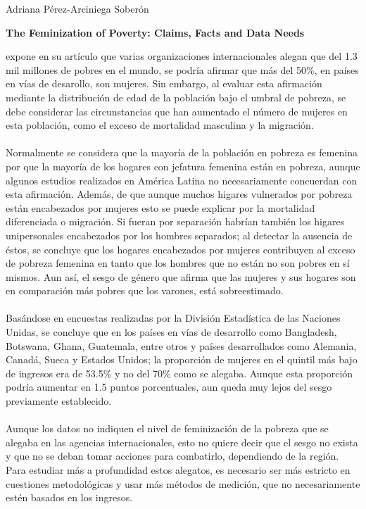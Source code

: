 \documentclass[11pt,spanish,letterpaper]{article}
\theoremstyle{plain}
\begin{document}
\begin{flushleft}
Adriana P\'erez-Arciniega Sober\'on
\end{flushleft}
\begin{center}
\textbf{The Feminization of Poverty: Claims, Facts and Data Needs}
\end{center}
\cite{marcoux1998feminization} expone en su art\'iculo que varias organizaciones internacionales alegan que del 1.3 mil millones de pobres en el mundo, se podr\'ia afirmar que m\'as del 50\%, en pa\'ises en v\'ias de desarollo, son mujeres. Sin embargo, al evaluar esta afirmaci\'on mediante la distribuci\'on de edad de la poblaci\'on bajo el umbral de pobreza, se debe considerar las circunstancias que han aumentado el n\'umero de mujeres en esta poblaci\'on, como el exceso de mortalidad masculina y la migraci\'on.\\
\\
Normalmente se considera que la mayor\'ia de la poblaci\'on en pobreza es femenina por que la mayor\'ia de los hogares con jefatura femenina est\'an en pobreza, aunque algunos estudios realizados en Am\'erica Latina no necesariamente concuerdan con esta afirmaci\'on. Adem\'as, de que aunque muchos higares vulnerados por pobreza est\'an encabezados por mujeres esto se puede explicar por la mortalidad diferenciada o migraci\'on. Si fueran por separaci\'on habr\'ian tambi\'en los higares unipersonales encabezados por los hombres separados; al detectar la ausencia de \'estos, se concluye que los hogares encabezados por mujeres contribuyen al exceso de pobreza femenina en tanto que los hombres que no est\'an no son pobres en s\'i mismos. Aun as\'i, el sesgo de g\'enero que afirma que las mujeres y sus hogares  son en comparaci\'on m\'as pobres que los varones, est\'a sobreestimado.\\
\\
Bas\'andose en encuestas realizadas por la Divisi\'on Estad\'istica de las Naciones Unidas, se concluye que en los pa\'ises en v\'ias de desarrollo como Bangladesh, Botswana, Ghana, Guatemala, entre otros y pa\'ises desarrollados como Alemania, Canad\'a, Sueca y Estados Unidos; la proporci\'on de mujeres en el quintil m\'as bajo de ingresos era de 53.5\% y no del 70\% como se alegaba. Aunque esta proporci\'on podr\'ia aumentar en 1.5 puntos porcentuales, aun queda muy lejos del sesgo previamente establecido.\\
\\
Aunque los datos no indiquen el nivel de feminizaci\'on de la pobreza que se alegaba en las agencias internacionales, esto no quiere decir que el sesgo no exista y que no se deban tomar acciones para combatirlo, dependiendo de la regi\'on. Para estudiar m\'as a profundidad estos alegatos, es necesario ser m\'as estricto en cuestiones metodol\'ogicas y usar m\'as m\'etodos de medici\'on, que no necesariamente est\'en basados en los ingresos.


\end{document}
